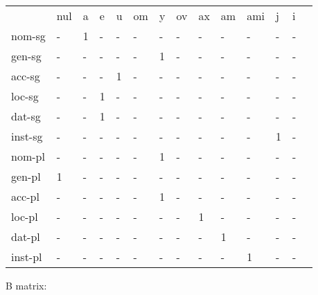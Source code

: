 \documentclass{article}
\begin{document}
\begin{tabular}{llllllllllllll}\toprule
                &nul     &a       &e       &u       &om      &y       &ov      &ax      &am      &ami     &j       &i       \\ 
nom-sg     &    -   &     1  &    -   &    -   &    -   &    -   &    -   &    -   &    -   &    -   &    -   &    -   \\ 
gen-sg     &    -   &    -   &    -   &    -   &    -   &     1  &    -   &    -   &    -   &    -   &    -   &    -   \\ 
acc-sg     &    -   &    -   &    -   &     1  &    -   &    -   &    -   &    -   &    -   &    -   &    -   &    -   \\ 
loc-sg     &    -   &    -   &     1  &    -   &    -   &    -   &    -   &    -   &    -   &    -   &    -   &    -   \\ 
dat-sg     &    -   &    -   &     1  &    -   &    -   &    -   &    -   &    -   &    -   &    -   &    -   &    -   \\ 
inst-sg    &    -   &    -   &    -   &    -   &    -   &    -   &    -   &    -   &    -   &    -   &     1  &    -   \\ 
nom-pl     &    -   &    -   &    -   &    -   &    -   &     1  &    -   &    -   &    -   &    -   &    -   &    -   \\ 
gen-pl     &     1  &    -   &    -   &    -   &    -   &    -   &    -   &    -   &    -   &    -   &    -   &    -   \\ 
acc-pl     &    -   &    -   &    -   &    -   &    -   &     1  &    -   &    -   &    -   &    -   &    -   &    -   \\ 
loc-pl     &    -   &    -   &    -   &    -   &    -   &    -   &    -   &     1  &    -   &    -   &    -   &    -   \\ 
dat-pl     &    -   &    -   &    -   &    -   &    -   &    -   &    -   &    -   &     1  &    -   &    -   &    -   \\ 
inst-pl    &    -   &    -   &    -   &    -   &    -   &    -   &    -   &    -   &    -   &     1  &    -   &    -   \\ 
\end{tabular}

 \vspace{0.2in}
 
B matrix:
\end{document}
